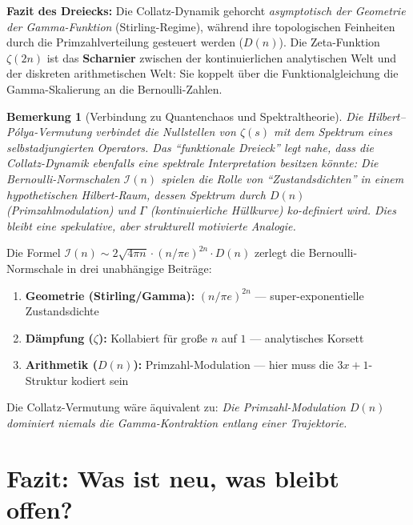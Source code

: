 \documentclass[12pt,a4paper]{article}
\newtheorem{bemerkung}[definition]{Bemerkung}
\newcommand{\In}{\mathcal{I}}      %
\newcommand{\Denom}[1]{D(#1)}     %
\begin{document}
\medskip
\textbf{Fazit des Dreiecks:} Die Collatz-Dynamik gehorcht \emph{asymptotisch der
Geometrie der Gamma-Funktion} (Stirling-Regime), während ihre topologischen
Feinheiten durch die Primzahlverteilung gesteuert werden ($\Denom{n}$).
Die Zeta-Funktion $\zeta(2n)$ ist das \textbf{Scharnier} zwischen der
kontinuierlichen analytischen Welt und der diskreten arithmetischen Welt:
Sie koppelt über die Funktionalgleichung die Gamma-Skalierung an die Bernoulli-Zahlen.

\begin{bemerkung}[Verbindung zu Quantenchaos und Spektraltheorie]
Die Hilbert--Pólya-Vermutung verbindet die Nullstellen von $\zeta(s)$ mit dem
Spektrum eines selbstadjungierten Operators. Das ``funktionale Dreieck'' legt
nahe, dass die Collatz-Dynamik ebenfalls eine \emph{spektrale} Interpretation
besitzen könnte: Die Bernoulli-Normschalen $\In(n)$ spielen die Rolle von
``Zustandsdichten'' in einem hypothetischen Hilbert-Raum, dessen Spektrum
durch $\Denom{n}$ (Primzahlmodulation) und $\Gamma$ (kontinuierliche Hüllkurve)
ko-definiert wird. Dies bleibt eine spekulative, aber strukturell motivierte Analogie.
\end{bemerkung}

\begin{tcolorbox}[colback=blue!5,colframe=blue!75!black,title={Kernaussage: Funktionales Dreieck}]
Die Formel $\In(n) \sim 2\sqrt{4\pi n}\cdot(n/\pi e)^{2n}\cdot \Denom{n}$ zerlegt die Bernoulli-Normschale in drei unabhängige Beiträge:
\begin{enumerate}[leftmargin=*, noitemsep]
\item \textbf{Geometrie (Stirling/Gamma):} $(n/\pi e)^{2n}$ --- super-exponentielle Zustandsdichte
\item \textbf{Dämpfung ($\zeta$):} Kollabiert für große $n$ auf $1$ --- analytisches Korsett
\item \textbf{Arithmetik ($\Denom{n}$):} Primzahl-Modulation --- hier muss die $3x+1$-Struktur kodiert sein
\end{enumerate}
Die Collatz-Vermutung wäre äquivalent zu: \emph{Die Primzahl-Modulation $\Denom{n}$ dominiert niemals die Gamma-Kontraktion entlang einer Trajektorie.}
\end{tcolorbox}

\section{Fazit: Was ist neu, was bleibt offen?}
\label{sec:fazit}
\end{document}
